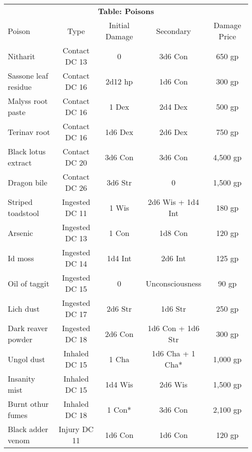 \begin{table}
\begin{tabular}[h!]{l|cccc}
\multicolumn{5}{c}{\textbf{Table: Poisons}} \\
Poison                 & Type          & Initial Damage & Secondary                    & Damage Price \\ \hline
Nitharit               & Contact DC 13 & 0              & 3d6 Con                      & 650 gp   \\
Sassone leaf residue   & Contact DC 16 & 2d12 hp        & 1d6 Con                      & 300 gp   \\
Malyss root paste      & Contact DC 16 & 1 Dex          & 2d4 Dex                      & 500 gp   \\
Terinav root           & Contact DC 16 & 1d6 Dex        & 2d6 Dex                      & 750 gp   \\ 
Black lotus extract    & Contact DC 20 & 3d6 Con        & 3d6 Con                      & 4,500 gp \\
Dragon bile            & Contact DC 26 & 3d6 Str        & 0	                           & 1,500 gp \\
Striped toadstool      & Ingested DC 11& 1 Wis          & 2d6 Wis + 1d4 Int            & 180 gp   \\
Arsenic                & Ingested DC 13& 1 Con          & 1d8 Con                      & 120 gp   \\
Id moss                & Ingested DC 14& 1d4 Int        & 2d6 Int                      & 125 gp   \\
Oil of taggit          & Ingested DC 15& 0              & Unconsciousness              & 90 gp    \\
Lich dust              & Ingested DC 17& 2d6 Str        & 1d6 Str                      & 250 gp   \\
Dark reaver powder     & Ingested DC 18& 2d6 Con        & 1d6 Con + 1d6 Str            & 300 gp   \\
Ungol dust             & Inhaled  DC 15& 1 Cha          & 1d6 Cha + 1 Cha*             & 1,000 gp \\
Insanity mist          & Inhaled DC 15 & 1d4 Wis        & 2d6 Wis                      & 1,500 gp \\
Burnt othur fumes      & Inhaled DC 18 & 1 Con*         & 3d6 Con                      & 2,100 gp \\
Black adder venom      & Injury DC 11  & 1d6 Con        & 1d6 Con                      & 120 gp   \\

\end{tabular}
\end{table}
